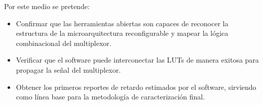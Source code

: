 Por este medio se pretende:

\begin{itemize}

	\item Confirmar que las herramientas abiertas son capaces de 
	reconocer la estructura de la microarquitectura reconfigurable y 
	mapear la lógica combinacional del multiplexor.

	\item Verificar que el software puede interconectar las LUTs de 
	manera exitosa para propagar la señal del multiplexor.

	\item Obtener los primeros reportes de retardo estimados por el 
	software, sirviendo como línea base para la metodología de 
	caracterización final.

\end{itemize}

